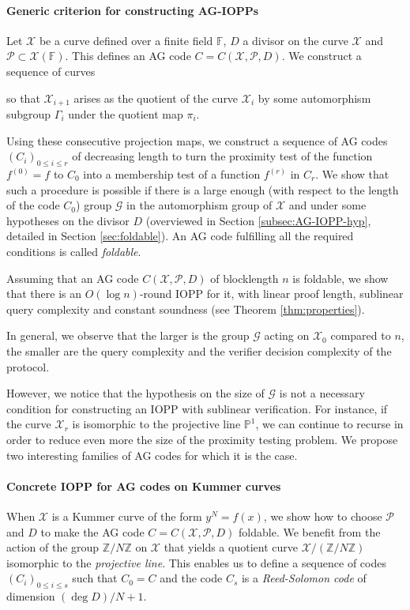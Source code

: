 \documentclass[a4paper,USenglish,autoref]{lipics-v2021}
\newcommand\F{\mathbb{F}}
\newcommand\PP{\mathbb{P}}
\newcommand\Z{\mathbb{Z}}
\newcommand\calX{\mathcal{X}}
\newcommand\calP{\mathcal{P}}
\newcommand\calG{\mathcal{G}}
\newcommand\mydef{\coloneqq}
\begin{document}
\paragraph*{Generic criterion for constructing AG-IOPPs}
Let $\calX$ be a curve defined over a finite field $\F$, $D$ a divisor on the curve $\calX$ and $\calP \subset \calX(\F)$. This defines an AG code $C=C(\calX, \calP, D)$. We construct a sequence of curves
\begin{center}
\end{center}
so that $\calX_{i+1}$ arises as the quotient of the curve $\calX_i$ by some automorphism subgroup $\Gamma_i$ under the quotient map $\pi_i$. 

Using these consecutive projection maps, we construct a sequence of AG codes $(C_i)_{0 \le i \le r}$ of decreasing length to turn the proximity test of the function $f^{(0)}=f$ to $C_0$ into a membership test of a function $f^{(r)}$ in $C_r$. We show that such a procedure is possible if there is a large enough (with respect to the length of the code $C_0$) group $\calG$ in the automorphism group of $\calX$ and under some hypotheses on the divisor $D$ (overviewed in Section \ref{subsec:AG-IOPP-hyp}, detailed in Section \ref{sec:foldable}). An AG code fulfilling all the required conditions is called \emph{foldable}.


Assuming that an AG code $C(\calX, \calP, D)$ of blocklength $n$ is foldable, we show that there is an $O(\log n)$-round IOPP for it, with linear proof length, sublinear query complexity and constant soundness (see Theorem \ref{thm:properties}).


In general, we observe that the larger is the group $\calG$ acting on $\calX_0$ compared to $n$, the smaller are the query complexity and the verifier decision complexity of the protocol. 

However, we notice that the hypothesis on the size of $\calG$ is not a necessary condition for constructing an IOPP with sublinear verification. For instance, if the curve $\calX_r$ is isomorphic to the projective line $\PP^1$, we can continue to recurse in order to reduce even more the size of the proximity testing problem. We propose two interesting families of AG codes for which it is the case.

\paragraph*{Concrete IOPP for AG codes on Kummer curves}
When $\calX$ is a Kummer curve of the form $y^N = f(x)$, we show how to choose $\calP$ and $D$ to make the AG code $C = C(\calX, \calP, D)$ foldable. We benefit from the action of the group $\Z / N \Z$ on $\calX$ that yields a quotient curve $\calX / (\Z/N\Z)$ isomorphic to the \emph{projective line}. This enables us to define a sequence of codes $(C_i)_{0 \le i \le s}$ such that $C_0 = C$ and the code $C_s$ is a \textit{Reed-Solomon code} of dimension $(\deg{D})/N + 1$.
%
\end{document}
